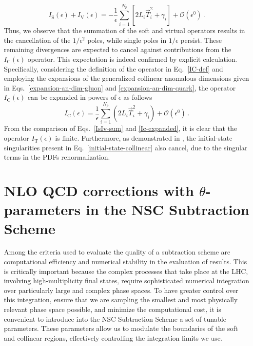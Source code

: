 \documentclass[a4paper, 12pt]{book}
\begin{document}
\begin{equation}
  I_{\mathrm{S}}(\epsilon)+I_{\mathrm{V}}(\epsilon)= - \frac{1}{\epsilon} \sum_{i=1}^{N_p} \left[2 L_i \vec{T}_i^2 + \gamma _i\right] + \mathcal{O}(\epsilon^0)\, .
  \label{IsIv-sum}
\end{equation}
Thus, we observe that the summation of the soft and virtual operators results in the cancellation of the $1/\epsilon^2$ poles, while single poles in $1/\epsilon$ persist. These remaining divergences are expected to cancel against contributions from the $I_{\mathrm{C}}(\epsilon)$ operator. This expectation is indeed confirmed by explicit calculation. Specifically, considering the definition of the operator in Eq.~\ref{IC-def} and employing the expansions of the generalized collinear anomalous dimensions given in Eqs.~\ref{expansion-an-dim-gluon} and \ref{expansion-an-dim-quark}, the operator $I_{\mathrm{C}}(\epsilon)$ can be expanded in powers of $\epsilon$ as follows
\begin{equation}
  I_{\mathrm{C}}(\epsilon)= \frac{1}{\epsilon}\sum_{i=1}^{N_p} \left( 2 L_i \vec{T}_i^2 + \gamma _i \right) + \mathcal{O}(\epsilon^0)\, .
  \label{Ic-expanded}
\end{equation}
From the comparison of Eqs.~\ref{IsIv-sum} and \ref{Ic-expanded}, it is clear that the operator $I_{\mathrm{T}}(\epsilon)$ is finite. Furthermore, as demonstrated in \cite{Devoto:2025kin}, the initial-state singularities present in Eq.~\ref{initial-state-collinear} also cancel, due to the singular terms in the PDFs renormalization.

\clearpage

\chapter{NLO QCD corrections with $\theta$-parameters in the NSC Subtraction Scheme}
\label{NSC-SS-parameters}
Among the criteria used to evaluate the quality of a subtraction scheme are computational efficiency and numerical stability in the evaluation of results. This is critically important because the complex processes that take place at the LHC, involving high-multiplicity final states, require sophisticated numerical integration over particularly large and complex phase spaces. To have greater control over this integration, ensure that we are sampling the smallest and most physically relevant phase space possible, and minimize the computational cost, it is convenient to introduce into the NSC Subtraction Scheme a set of tunable parameters. These parameters allow us to modulate the boundaries of the soft and collinear regions, effectively controlling the integration limits we use.
\end{document}
